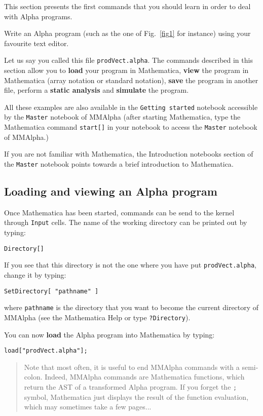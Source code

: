 \documentclass[12pt]{article}
\newcommand{\Alpha}{{\sc Alpha}}
\newcommand{\MMA}{{\sc MMAlpha}}
\newcommand{\alfa}{\Alpha}
\newcommand{\mmalfa}{\MMA}
\newcommand{\mmalpha}{\MMA}
\newcommand{\mma}{{Mathematica}}
\begin{document}
This section presents the first commands that you should learn in
order to deal with {\Alpha} programs. 

Write an {\Alpha}
program (such as the one of Fig.~\ref{fig1} for instance) using your
favourite text editor. 

Let us say you called this file \texttt{prodVect.alpha}.
The commands described in this section allow you to
{\bf load} your program in \mma{}, {\bf view} the program in
\mma{} (array notation or standard notation), {\bf save} the
program in another file, perform a {\bf static analysis} and {\bf simulate}
the program. 

All these examples are also available
in the \texttt{Getting started} notebook accessible by the 
\texttt{Master} notebook of \mmalfa{} (after starting
\mma{}, type the \mma{} command
{\tt start[]} in your notebook to  access the \texttt{Master} notebook of \mmalfa{}.)

If you are not familiar with \mma{}, the 
Introduction 
notebooks section of the
\texttt{Master} notebook
points towards a brief introduction to \mma{}.

\subsection{Loading and viewing an {\Alpha} program}
Once \mma{} has been started, commands can be send to 
the kernel through \texttt{Input} cells. 
The name of the working directory can be printed out
by typing:
\begin{verbatim}
Directory[]
\end{verbatim}

If you see that this directory is not the one where you have put 
{\tt prodVect.alpha}, change it by typing:
\begin{verbatim}
SetDirectory[ "pathname" ]
\end{verbatim}
where \texttt{pathname} is 
the directory that you want to become the current directory of 
\mmalpha{} (see the \mma{} Help or type \texttt{?Directory}).

You can now {\bf load} the {\Alpha} program into \mma{}
by typing:\\
\begin{verbatim}
load["prodVect.alpha"];
\end{verbatim}
\begin{small}
\begin{quotation}
Note that most often, it is useful to end 
\mmalfa{} commands with a semi-colon.
Indeed, \mmalfa{} commands are \mma{} functions, 
which return the AST of a transformed \alfa{} program.
If you forget the {\tt ;} symbol, 
\mma{} just displays the result of the function evaluation, 
which may sometimes take a few pages... 
\end{quotation}
\end{small}
\end{document}
